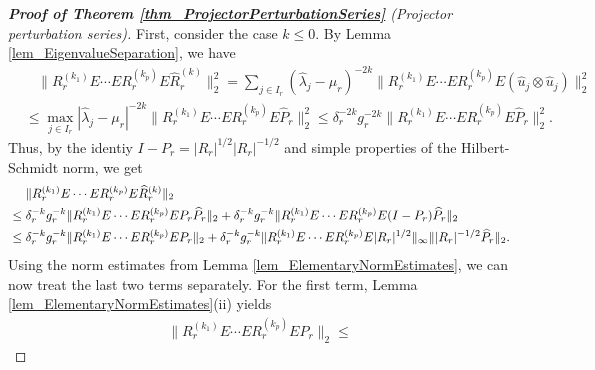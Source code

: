 \documentclass[a4paper,11pt]{article} %
\numberwithin{equation}{section}
\theoremstyle{definition}
\theoremstyle{remark}
\theoremstyle{plain}
\begin{document}
\begin{proof}[\normalfont \textbf{Proof of Theorem \ref{thm_ProjectorPerturbationSeries}} (Projector perturbation series)]
  First, consider the case $k\leq 0$. By Lemma \ref{lem_EigenvalueSeparation},
  we have
  \begin{align}
    & \ \ \ \
         \| R_{r}^{ ( k_{1} ) } E \cdots E R_{r}^{ ( k_{p} ) } 
                                         E \widehat{R}_{r}^{ (k) }
         \|_{2}^2 
    = 
         \sum_{ j \in I_{r} } 
         ( \widehat{ \lambda }_{j} - \mu_{r} )^{-2k}
         \| R_{r}^{ ( k_{1} ) } E \cdots E R_{r}^{ ( k_{p} ) } E 
                 ( \widehat{u}_{j} \otimes \widehat{u}_{j} )
         \|_{2}^2
   \\
   & \le
         \max_{ j \in I_{r}} | \widehat{ \lambda }_{j} - \mu_{r} |^{-2k}
         \| R_{r}^{ ( k_{1} ) } E \cdots E R_{r}^{ ( k_{p} ) } E \widehat{P}_{r}  
         \|_{2}^2
     \le 
         \delta_r^{-2k} g_r^{-2k}
         \| R_{r}^{ ( k_{1} ) } E \cdots E R_{r}^{ ( k_{p} ) } E \widehat{P}_{r}  
         \|_{2}^2.
  \end{align}
  Thus, by the identiy \( I - P_{r} = | R_{r} |^{1/2} | R_{r} |^{-1/2} \) and
  simple properties of the Hilbert-Schmidt norm, we get
  \begin{align}
    \label{eq_KLess0_1}
    & \ \ \ \
            \| R_{r}^{ ( k_{1} ) } E \cdots E R_{r}^{ ( k_{p} ) } 
                                            E \widehat{R}_{r}^{ (k) }
            \|_{2}
    \\
    & \le 
            \delta_r^{-k}g_r^{-k} 
            \| R_{r}^{ ( k_{1} ) } E \cdots E R_{r}^{ ( k_{p} ) } E 
               P_{r} \widehat{P}_{r}
            \|_{2} \notag
        + 
            \delta_r^{-k}g_r^{-k}\| R_{r}^{ ( k_{1} ) } E \cdots E R_{r}^{ ( k_{p} ) } E 
               (I - P_{r}) \widehat{P}_{r} 
            \|_{2}
    \notag
    \\
    & \le   
            \delta_r^{-k}g_r^{-k} 
            \| R_{r}^{ ( k_{1} ) } E \cdots E R_{r}^{ ( k_{p} ) } E P_{r}
            \|_{2}
         +  
            \delta_r^{-k} g_r^{-k} 
            \|   R_{r}^{ ( k_{1} ) } E \cdots E R_{r}^{ ( k_{p} ) } E 
               | R_{r} |^{1/2}
            \|_{\infty} 
            \| | R_{r} |^{-1/2} \widehat{P}_{r} \|_{2}.
    \notag
  \end{align}
  Using the norm estimates from Lemma \ref{lem_ElementaryNormEstimates}, we can
  now treat the last two terms separately.
  For the first term, Lemma \ref{lem_ElementaryNormEstimates}(ii) yields
  \begin{align}
    \label{eq_KLess0_2}
      \| R_{r}^{ ( k_{1} ) } E \cdots E R_{r}^{ ( k_{p} ) } E P_{r} \|_{2}
    \le 

\end{align}
\end{proof}
\end{document}
